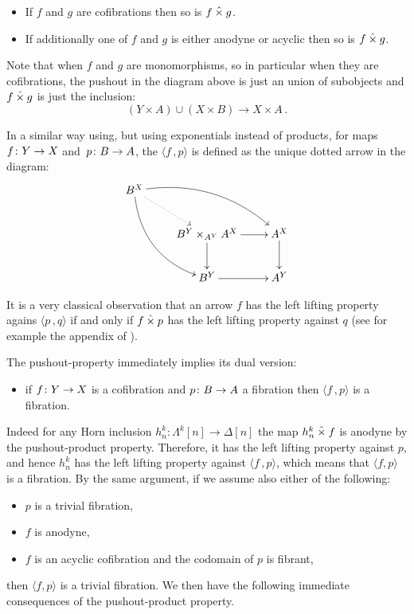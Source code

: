 \documentclass[reqno,10pt,a4paper,oneside,draft]{amsart}
\begin{document}
\begin{itemize}
\item If $f$ and $g$ are cofibrations then so is $f \mathbin{\hat{\times}} g$.
\item If additionally one of $f$ and $g$ is either anodyne or acyclic then so is $f \mathbin{\hat{\times}} g$.
\end{itemize}
Note that when $f$ and $g$ are monomorphisms, so in particular when they are cofibrations, the pushout in the diagram above is just an union of subobjects and $f \mathbin{\hat{\times}} g$ is just the inclusion:
\[  
(Y \times A) \cup (X \times B) \rightarrow X \times A \, .
\]






In a similar way using, but using  exponentials instead of products, for maps $f \colon Y \rightarrow X$ and~$p \colon B \rightarrow A$, the   $\langle f \, , p \rangle$ is defined as the unique dotted arrow in the diagram:
\[
\xymatrix{
 B^X \ar@{.>}[dr] \ar@/^1.5pc/[drr] \ar@/_1.5pc/[ddr] \\
& B^Y \times_{A^Y} A^X \ar[r] \ar[d] &  A^X \ar[d]  \\
& B^Y \ar[r] & A^Y  \\
 }
 \]
 
 \medskip
 
It is a very classical observation that an arrow $f$ has the left lifting property agains $\langle p \, , q \rangle$ if and only if $f \mathbin{\hat{\times}} p$ has the left lifting property against $q$ (see for example the appendix of \cite{joyal-tierney-segal}). 

\medskip


The pushout-property immediately implies its dual version: 
\begin{itemize}
\item if $f \colon Y \to X$ is a cofibration and $p \colon B \to A$ a fibration then $\langle f \, , p \rangle$ is a fibration.
\end{itemize}
 Indeed for any Horn inclusion $h^k_n: \Lambda^k[n] \rightarrow \Delta[n]$ the map $h^k_n \mathbin{\hat{\times}} f$ is anodyne by the pushout-product property. Therefore,  it has the left lifting property against $p$, and hence $h^k_n$ has the left lifting property against $\langle f \, , p  \rangle$, which means that   $\langle f, p \rangle$ is a fibration. By the same argument, if we  assume also either of the following:
\begin{itemize}
\item $p$ is a trivial fibration,
\item $f$ is anodyne,
\item $f$ is an acyclic cofibration and the codomain of $p$ is fibrant,
\end{itemize}
then $\langle f , p \rangle$ is a trivial fibration.  We then have the following immediate consequences of the pushout-product property.
\end{document}
